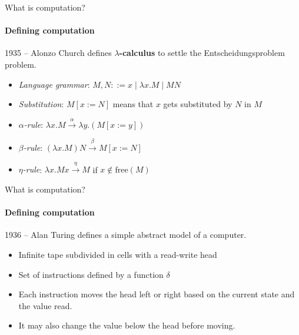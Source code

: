 \documentclass{beamer}
\begin{document}
\begin{frame}{What is computation?}
\framesubtitle{Defining computation}

    1935 -- Alonzo Church defines \textbf{$\lambda$-calculus} to settle the Entscheidungsproblem problem.
    
    \begin{itemize}[<+->]
        \item \textit{Language grammar}: $M,N ::= x \mid \lambda x.M \mid MN$
        \item \textit{Substitution}: $M[x := N]$ means that $x$ gets substituted by $N$ in $M$
        \item \textit{$\alpha$-rule}: $\lambda x.M \xrightarrow{\alpha} \lambda y.(M[x := y])$
        \item \textit{$\beta$-rule}: $(\lambda x.M)N \xrightarrow{\beta} M[x := N]$
        \item \textit{$\eta$-rule}: $\lambda x. Mx \xrightarrow{\eta} M$ if $x \notin \mathrm{free}(M)$
    \end{itemize}

    \quad

\end{frame}

\begin{frame}{What is computation?}
\framesubtitle{Defining computation}

    1936 -- Alan Turing defines a simple abstract model of a computer.

    \begin{itemize}[<+->]
        \item Infinite tape subdivided in cells with a read-write head
        \item Set of instructions defined by a function $\delta$
        \item Each instruction moves the head left or right based on the current state and the value read.
        \item It may also change the value below the head before moving.
    \end{itemize}

    \quad

\end{frame}
\end{document}
